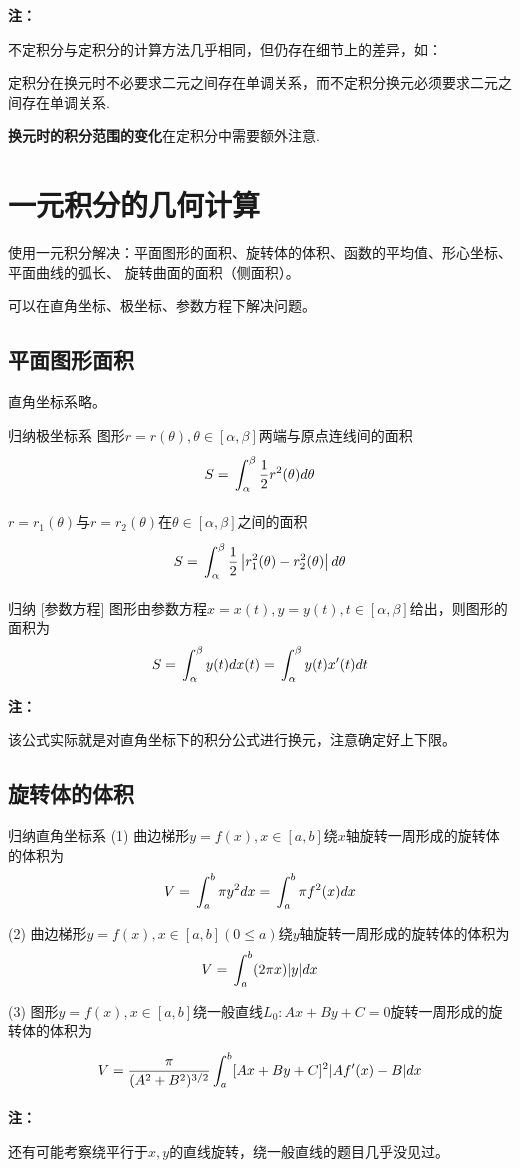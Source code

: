 \documentclass[a4paper,12pt,oneside,fontset=none]{ctexbook}
\renewcommand{\leq}{\leqslant}
\let\olddfrac\dfrac
\renewcommand{\dfrac}[2]{
    \olddfrac{#1\vrule width 0pt height 1.15em depth 0em}{#2\vrule width 0pt height 0em depth 0.6em}
}
\let\oldint\int
\renewcommand{\int}{\displaystyle{\vrule width 0pt height 0em depth 0em}\oldint}
\newenvironment{induction}[1][]{\begin{thmBox}{归纳}{#1}}{\end{thmBox}}
\newenvironment{note}{
    \par\vspace{0.5em}\noindent
    \textbf{\color{NoteColor} 注：}
}{
    \par\vspace{0.5em}
}
\numberwithin{equation}{chapter}
\begin{document}
\begin{note}
    不定积分与定积分的计算方法几乎相同，但仍存在细节上的差异，如：

    定积分在换元时不必要求二元之间存在单调关系，而不定积分换元必须要求二元之间存在单调关系.

    \textbf{换元时的积分范围的变化}在定积分中需要额外注意.

\end{note}





\chapter{一元积分的几何计算}
使用一元积分解决：平面图形的面积、旋转体的体积、函数的平均值、形心坐标、平面曲线的弧长、
旋转曲面的面积（侧面积）。

可以在直角坐标、极坐标、参数方程下解决问题。
\section{平面图形面积}
直角坐标系略。
\begin{induction}[极坐标系]
    图形$r=r(\theta), \theta \in [\alpha, \beta]$两端与原点连线间的面积
    $$S = \int_{\alpha }^{\beta} \dfrac{1}{2}r^2(\theta)d\theta$$
    
    $r=r_1(\theta)$与$r=r_2(\theta)$在$\theta \in [\alpha, \beta]$之间的面积
    $$S = \int_{\alpha }^{\beta} \dfrac{1}{2}\left|r_1^2(\theta) - r_2^2(\theta)\right|d\theta$$
\end{induction}

\begin{induction}
    [参数方程]
    图形由参数方程$x=x(t), y=y(t), t \in [\alpha, \beta]$给出，则图形的面积为
    $$S = \int_{\alpha}^{\beta} y(t)dx(t) = \int_{\alpha}^{\beta} y(t)x'(t)dt$$
\end{induction}
\begin{note}
    该公式实际就是对直角坐标下的积分公式进行换元，注意确定好上下限。
\end{note}

\section{旋转体的体积}
\begin{induction}[直角坐标系]
    (1) 曲边梯形$y=f(x), x \in [a, b]$绕$x$轴旋转一周形成的旋转体的体积为
    $$V = \int_a^b \pi y^2 dx = \int_a^b \pi f^2(x) dx$$

    (2) 曲边梯形$y=f(x), x \in [a, b](0\leq a)$绕$y$轴旋转一周形成的旋转体的体积为
    $$V = \int_a^b (2\pi x) |y| dx$$

    (3) 图形$y=f(x), x \in [a, b]$绕一般直线$L_0:Ax+By+C=0$旋转一周形成的旋转体的体积为
    $$V = \dfrac{\pi}{(A^2+B^2)^{3/2}} \int_a^b [Ax+By+C]^2|Af'(x)-B| dx$$
\end{induction}
\begin{note}
    还有可能考察绕平行于$x,y$的直线旋转，绕一般直线的题目几乎没见过。
\end{note}
\end{document}
